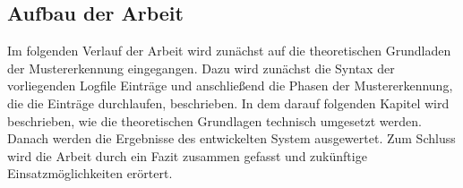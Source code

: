 \subsection{Aufbau der Arbeit}
\label{sub:Aufbau der Arbeit}
Im folgenden Verlauf der Arbeit wird zunächst auf die theoretischen Grundladen der Mustererkennung eingegangen. Dazu wird zunächst die Syntax der vorliegenden Logfile Einträge und anschließend die Phasen der Mustererkennung, die die Einträge durchlaufen, beschrieben. In dem darauf folgenden Kapitel wird beschrieben, wie die theoretischen Grundlagen technisch umgesetzt werden. Danach werden die Ergebnisse des entwickelten System ausgewertet. Zum Schluss wird die Arbeit durch ein Fazit zusammen gefasst und zukünftige Einsatzmöglichkeiten erörtert.






